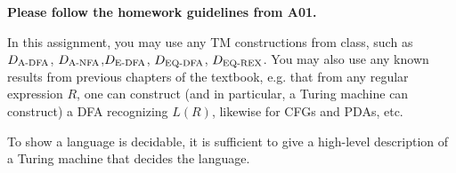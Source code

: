 \documentclass[11pt]{article}
\begin{document}
\assignmentnametitlestuff


\if{}
{\bf Please follow the homework guidelines from A01.}

\fi

In this assignment, you may use any TM constructions from class, such as $D_{\textnormal{A-DFA}}$, $D_{\textnormal{A-NFA}}$,$D_\textnormal{E-DFA}$, $D_\textnormal{EQ-DFA}$, $D_\textnormal{EQ-REX}$. You may also use any known results from previous chapters of the textbook, e.g. that from any regular expression $R$, one can construct (and in particular, a Turing machine can construct) a DFA recognizing $L(R)$, likewise for CFGs and PDAs, etc.

To show a language is decidable, it is sufficient to give a high-level description of a Turing machine that decides the language.
\end{document}
